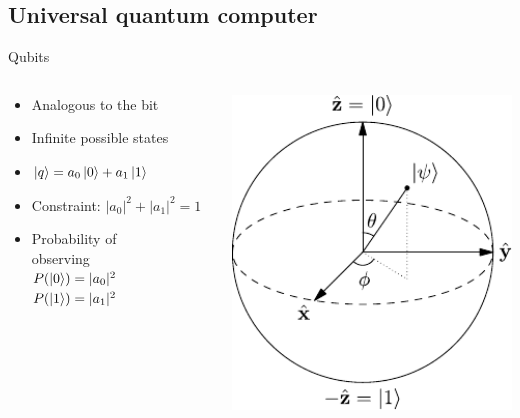 \documentclass[14pt]{beamer}
\begin{document}
\subsection{Universal quantum computer}
\begin{frame}{Qubits}
\begin{columns}[T]
	\begin{column}{.6\textwidth}
		\begin{block}{}
			\begin{itemize}
				\item Analogous to the bit
				\item Infinite possible states
				\pause
				\item $\ket{q} = a_0 \ket{0} + a_1 \ket{1}$
				\pause
				\item Constraint: $|a_0|^2 + |a_1|^2 = 1$
				\pause
				\item Probability of \\ observing \\ 
						$P(\ket{0}) = |a_0|^2$ \\
						$P(\ket{1}) = |a_1|^2$
			\end{itemize}
    	\end{block}
	\end{column}
	\begin{column}{.4\textwidth}
    	\begin{block}{}
			\includegraphics[width=1\textwidth]{../resources/pdfs/Bloch_Sphere.pdf}

\end{block}
\end{column}
\end{columns}
\end{frame}
\end{document}
